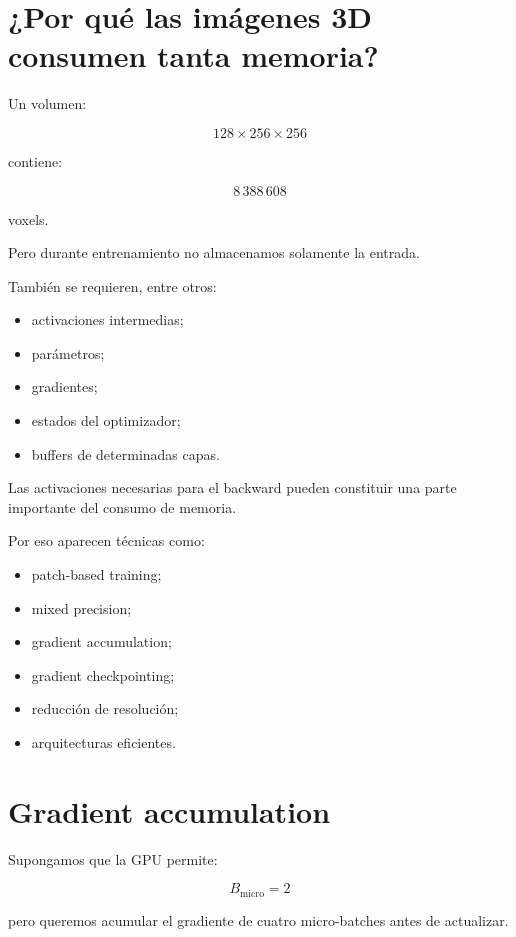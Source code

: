 \documentclass[
  letterpaper,
  DIV=11,
  numbers=noendperiod]{scrartcl}
\providecommand{\tightlist}{%
  \setlength{\itemsep}{0pt}\setlength{\parskip}{0pt}}
\begin{document}
\section{¿Por qué las imágenes 3D consumen tanta
memoria?}\label{por-quuxe9-las-imuxe1genes-3d-consumen-tanta-memoria}

Un volumen:

\[
128\times256\times256
\]

contiene:

\[
8\,388\,608
\]

voxels.

Pero durante entrenamiento no almacenamos solamente la entrada.

También se requieren, entre otros:

\begin{itemize}
\tightlist
\item
  activaciones intermedias;
\item
  parámetros;
\item
  gradientes;
\item
  estados del optimizador;
\item
  buffers de determinadas capas.
\end{itemize}

Las activaciones necesarias para el backward pueden constituir una parte
importante del consumo de memoria.

Por eso aparecen técnicas como:

\begin{itemize}
\tightlist
\item
  patch-based training;
\item
  mixed precision;
\item
  gradient accumulation;
\item
  gradient checkpointing;
\item
  reducción de resolución;
\item
  arquitecturas eficientes.
\end{itemize}

\section{Gradient accumulation}\label{gradient-accumulation}

Supongamos que la GPU permite:

\[
B_{\mathrm{micro}}=2
\]

pero queremos acumular el gradiente de cuatro micro-batches antes de
actualizar.
\end{document}

